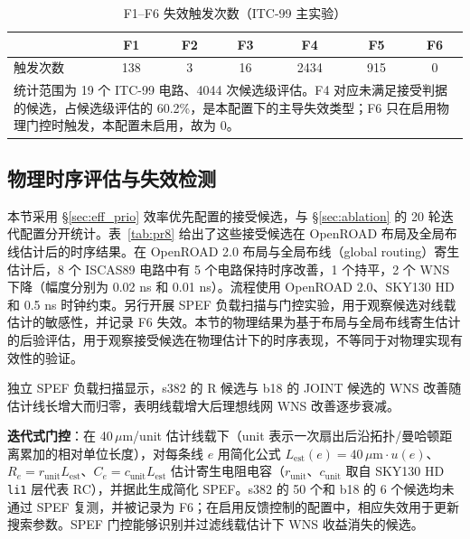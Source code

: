 \documentclass[twocolumn,10pt,fontset=windows]{ctexart}
\begin{document}
\begin{table}[!htb]
\centering
\caption{F1--F6 失效触发次数（ITC-99 主实验）}
\label{tab:f16_dist}
\scriptsize
\setlength{\tabcolsep}{3pt}
\begin{tabular}{lcccccc}
\toprule
 & \textbf{F1} & \textbf{F2} & \textbf{F3} & \textbf{F4} & \textbf{F5} & \textbf{F6} \\
\midrule
触发次数 & 138 & 3 & 16 & 2434 & 915 & 0 \\
\bottomrule
\multicolumn{7}{p{0.95\columnwidth}}{\footnotesize 统计范围为 19 个 ITC-99 电路、4044 次候选级评估。F4 对应未满足接受判据的候选，占候选级评估的 60.2\%，是本配置下的主导失效类型；F6 只在启用物理门控时触发，本配置未启用，故为 0。} \\
\end{tabular}
\end{table}

\subsection{物理时序评估与失效检测}\label{sec:phys_closure}

本节采用 \S\ref{sec:eff_prio} 效率优先配置的接受候选，与 \S\ref{sec:ablation} 的 20 轮迭代配置分开统计。表~\ref{tab:pr8} 给出了这些接受候选在 OpenROAD 布局及全局布线估计后的时序结果。在 OpenROAD 2.0 布局与全局布线（global routing）寄生估计后，8 个 ISCAS89 电路中有 5 个电路保持时序改善，1 个持平，2 个 WNS 下降（幅度分别为 0.02 ns 和 0.01 ns）。流程使用 OpenROAD 2.0、SKY130 HD 和 0.5 ns 时钟约束。另行开展 SPEF 负载扫描与门控实验，用于观察候选对线载估计的敏感性，并记录 F6 失效。本节的物理结果为基于布局与全局布线寄生估计的后验评估，用于观察接受候选在物理估计下的时序表现，不等同于对物理实现有效性的验证。


独立 SPEF 负载扫描显示，s382 的 R 候选与 b18 的 JOINT 候选的 WNS 改善随估计线长增大而归零，表明线载增大后理想线网 WNS 改善逐步衰减。

\textbf{迭代式门控}：在 40\,$\mu$m/unit 估计线载下（unit 表示一次扇出后沿拓扑/曼哈顿距离累加的相对单位长度），对每条线 $e$ 用简化公式 $L_{\mathrm{est}}(e)=40\,\mu\mathrm{m} \cdot u(e)$、$R_e=r_{\mathrm{unit}}L_{\mathrm{est}}$、$C_e=c_{\mathrm{unit}}L_{\mathrm{est}}$ 估计寄生电阻电容（$r_{\mathrm{unit}}$、$c_{\mathrm{unit}}$ 取自 SKY130 HD \texttt{li1} 层代表 RC），并据此生成简化 SPEF。s382 的 50 个和 b18 的 6 个候选均未通过 SPEF 复测，并被记录为 F6；在启用反馈控制的配置中，相应失效用于更新搜索参数。SPEF 门控能够识别并过滤线载估计下 WNS 收益消失的候选。
\end{document}
